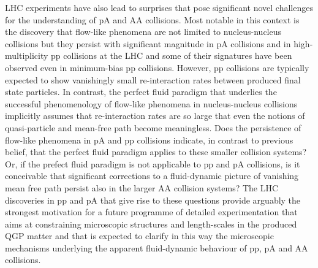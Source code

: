 \documentclass[../report.tex]{subfiles}
\begin{document}
LHC experiments have also lead to surprises that pose significant novel challenges for the understanding of pA and AA collisions. Most notable in this context is the discovery that flow-like phenomena are not limited to nucleus-nucleus collisions but they persist with significant magnitude in pA collisions and in high-multiplicity pp collisions at the LHC and some of their signatures have been observed even in minimum-bias pp collisions. However, pp collisions are typically expected to show vanishingly small re-interaction rates between produced final state particles. In contrast, the perfect fluid paradigm that underlies the successful phenomenology of flow-like phenomena in nucleus-nucleus collisions implicitly assumes that re-interaction rates are so large that even the notions of quasi-particle and mean-free path become meaningless. Does the persistence of flow-like phenomena in pA and pp collisions indicate, in contrast to previous belief, that the perfect fluid paradigm applies to these smaller collision systems? Or, if the prefect fluid paradigm is not applicable to pp and pA collisions, is it conceivable that significant corrections to a fluid-dynamic picture of vanishing mean free path persist also in the larger AA collision systems? The LHC discoveries in pp and pA that give rise to these questions provide arguably the strongest motivation for a future programme of detailed experimentation that aims at constraining microscopic structures and length-scales in the produced QGP matter and that is expected to clarify in this way the microscopic mechanisms underlying the apparent fluid-dynamic behaviour of pp, pA and AA collisions.   
\end{document}

